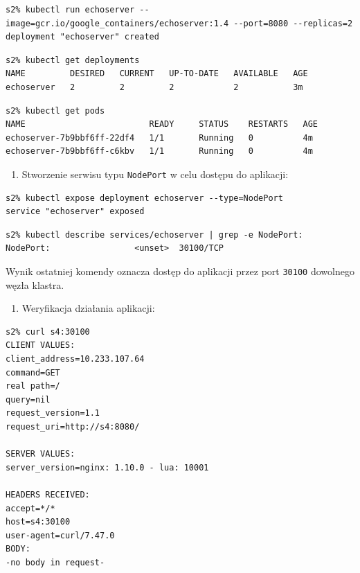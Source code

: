 \documentclass[a4paper,12pt,twoside,openany]{report}
\providecommand{\tightlist}{%
  \setlength{\itemsep}{0pt}\setlength{\parskip}{0pt}}
\newcommand{\passthrough}[1]{#1}
\begin{document}
\begin{lstlisting}
s2% kubectl run echoserver --image=gcr.io/google_containers/echoserver:1.4 --port=8080 --replicas=2
deployment "echoserver" created
\end{lstlisting}

\begin{lstlisting}
s2% kubectl get deployments
NAME         DESIRED   CURRENT   UP-TO-DATE   AVAILABLE   AGE
echoserver   2         2         2            2           3m
\end{lstlisting}

\begin{lstlisting}
s2% kubectl get pods
NAME                         READY     STATUS    RESTARTS   AGE
echoserver-7b9bbf6ff-22df4   1/1       Running   0          4m
echoserver-7b9bbf6ff-c6kbv   1/1       Running   0          4m
\end{lstlisting}

\begin{enumerate}
\def\labelenumi{\arabic{enumi}.}
\setcounter{enumi}{7}
\tightlist
\item
  Stworzenie serwisu typu \passthrough{\lstinline!NodePort!} w celu
  dostępu do aplikacji:
\end{enumerate}

\begin{lstlisting}
s2% kubectl expose deployment echoserver --type=NodePort
service "echoserver" exposed
\end{lstlisting}

\begin{lstlisting}
s2% kubectl describe services/echoserver | grep -e NodePort:
NodePort:                 <unset>  30100/TCP
\end{lstlisting}

Wynik ostatniej komendy oznacza dostęp do aplikacji przez port
\passthrough{\lstinline!30100!} dowolnego węzła klastra.

\begin{enumerate}
\def\labelenumi{\arabic{enumi}.}
\setcounter{enumi}{8}
\tightlist
\item
  Weryfikacja działania aplikacji:
\end{enumerate}

\begin{lstlisting}
s2% curl s4:30100
CLIENT VALUES:
client_address=10.233.107.64
command=GET
real path=/
query=nil
request_version=1.1
request_uri=http://s4:8080/

SERVER VALUES:
server_version=nginx: 1.10.0 - lua: 10001

HEADERS RECEIVED:
accept=*/*
host=s4:30100
user-agent=curl/7.47.0
BODY:
-no body in request-
\end{lstlisting}
\end{document}
